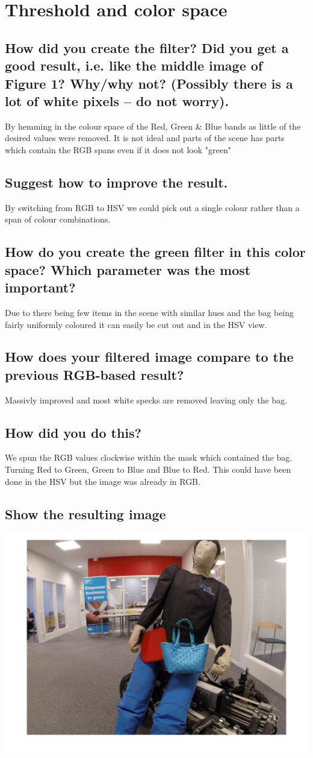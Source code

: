 \section{Threshold and color space}
\subsection{How did you create the filter? Did you get a good result, i.e. like the middle image of Figure 1? Why/why not? (Possibly there is a lot of white pixels – do not worry).}
By hemming in the colour space of the Red, Green \& Blue bands as little of the desired values were removed. It is not ideal and parts of the scene has parts which contain the RGB spans even if it does not look "green"
\subsection{Suggest how to improve the result.}
By switching from RGB to HSV we could pick out a single colour rather than a span of colour combinations.
\subsection{How do you create the green filter in this color space? Which parameter was the most important?}
Due to there being few items in the scene with similar hues and the bag being fairly uniformly coloured it can easily be cut out and in the HSV view.
\subsection{How does your filtered image compare to the previous RGB-based result?}
Massivly improved and most white specks are removed leaving only the bag.
\subsection{How did you do this?}
We spun the RGB values clockwise within the mask which contained the bag. Turning Red to Green, Green to Blue and Blue to Red. This could have been done in the HSV but the image was already in RGB.
\subsection{Show the resulting image}
\includegraphics[width=\textwidth]{./bluebag.jpg}
